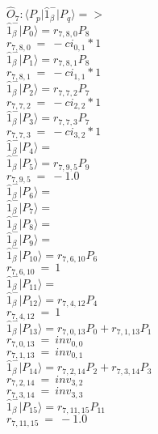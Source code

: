 \documentclass[14pt]{article}
\begin{document}
    $\hat{O}_{7}:  \langle{P_p}\vert \hat{1}_{\beta}^{-} \vert{P_q}\rangle => $ \\ 
    $ \hat{1}_{\beta}^{-} \vert{P_{0}}\rangle = {r}_{7,8,0}P_{8} $ \\ 
    ${r}_{7,8,0}\ =\ -{ci}_{0,1}*1 $ \\ 
    $ \hat{1}_{\beta}^{-} \vert{P_{1}}\rangle = {r}_{7,8,1}P_{8} $ \\ 
    ${r}_{7,8,1}\ =\ -{ci}_{1,1}*1 $ \\ 
    $ \hat{1}_{\beta}^{-} \vert{P_{2}}\rangle = {r}_{7,7,2}P_{7} $ \\ 
    ${r}_{7,7,2}\ =\ -{ci}_{2,2}*1 $ \\ 
    $ \hat{1}_{\beta}^{-} \vert{P_{3}}\rangle = {r}_{7,7,3}P_{7} $ \\ 
    ${r}_{7,7,3}\ =\ -{ci}_{3,2}*1 $ \\ 
    $ \hat{1}_{\beta}^{-} \vert{P_{4}}\rangle =  $ \\ 
    $ \hat{1}_{\beta}^{-} \vert{P_{5}}\rangle = {r}_{7,9,5}P_{9} $ \\ 
    ${r}_{7,9,5}\ =\ -1.0 $ \\ 
    $ \hat{1}_{\beta}^{-} \vert{P_{6}}\rangle =  $ \\ 
    $ \hat{1}_{\beta}^{-} \vert{P_{7}}\rangle =  $ \\ 
    $ \hat{1}_{\beta}^{-} \vert{P_{8}}\rangle =  $ \\ 
    $ \hat{1}_{\beta}^{-} \vert{P_{9}}\rangle =  $ \\ 
    $ \hat{1}_{\beta}^{-} \vert{P_{10}}\rangle = {r}_{7,6,10}P_{6} $ \\ 
    ${r}_{7,6,10}\ =\ 1 $ \\ 
    $ \hat{1}_{\beta}^{-} \vert{P_{11}}\rangle =  $ \\ 
    $ \hat{1}_{\beta}^{-} \vert{P_{12}}\rangle = {r}_{7,4,12}P_{4} $ \\ 
    ${r}_{7,4,12}\ =\ 1 $ \\ 
    $ \hat{1}_{\beta}^{-} \vert{P_{13}}\rangle = {r}_{7,0,13}P_{0}+{r}_{7,1,13}P_{1} $ \\ 
    ${r}_{7,0,13}\ =\ {inv}_{0,0} $ \\ 
    ${r}_{7,1,13}\ =\ {inv}_{0,1} $ \\ 
    $ \hat{1}_{\beta}^{-} \vert{P_{14}}\rangle = {r}_{7,2,14}P_{2}+{r}_{7,3,14}P_{3} $ \\ 
    ${r}_{7,2,14}\ =\ {inv}_{3,2} $ \\ 
    ${r}_{7,3,14}\ =\ {inv}_{3,3} $ \\ 
    $ \hat{1}_{\beta}^{-} \vert{P_{15}}\rangle = {r}_{7,11,15}P_{11} $ \\ 
    ${r}_{7,11,15}\ =\ -1.0 $ \\ 
    
\end{document}
